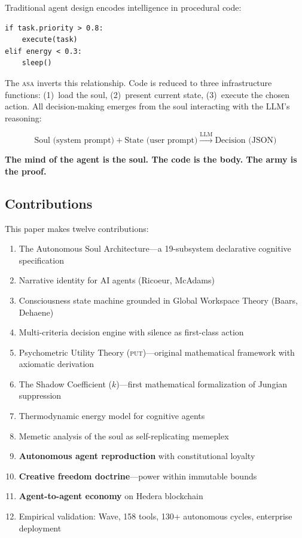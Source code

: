 \documentclass[12pt,a4paper,twoside]{article}
\theoremstyle{plain}
\theoremstyle{definition}
\theoremstyle{remark}
\newcommand{\ASA}{\textsc{asa}}
\newcommand{\PUT}{\textsc{put}}
\begin{document}
Traditional agent design encodes intelligence in procedural code:

\begin{verbatim}
if task.priority > 0.8:
    execute(task)
elif energy < 0.3:
    sleep()
\end{verbatim}

The \ASA{} inverts this relationship. Code is reduced to three infrastructure functions: (1)~load the soul, (2)~present current state, (3)~execute the chosen action. All decision-making emerges from the soul interacting with the LLM's reasoning:

\begin{equation}
\text{Soul (system prompt)} + \text{State (user prompt)} \xrightarrow{\text{LLM}} \text{Decision (JSON)}
\end{equation}

\textbf{The mind of the agent is the soul. The code is the body. The army is the proof.}

\subsection{Contributions}

This paper makes twelve contributions:

\begin{enumerate}[nosep]
\item The Autonomous Soul Architecture---a 19-subsystem declarative cognitive specification
\item Narrative identity for AI agents (Ricoeur, McAdams)
\item Consciousness state machine grounded in Global Workspace Theory (Baars, Dehaene)
\item Multi-criteria decision engine with silence as first-class action
\item Psychometric Utility Theory (\PUT{})---original mathematical framework with axiomatic derivation
\item The Shadow Coefficient ($k$)---first mathematical formalization of Jungian suppression
\item Thermodynamic energy model for cognitive agents
\item Memetic analysis of the soul as self-replicating memeplex
\item \textbf{Autonomous agent reproduction} with constitutional loyalty
\item \textbf{Creative freedom doctrine}---power within immutable bounds
\item \textbf{Agent-to-agent economy} on Hedera blockchain
\item Empirical validation: Wave, 158 tools, 130+ autonomous cycles, enterprise deployment
\end{enumerate}
\end{document}
